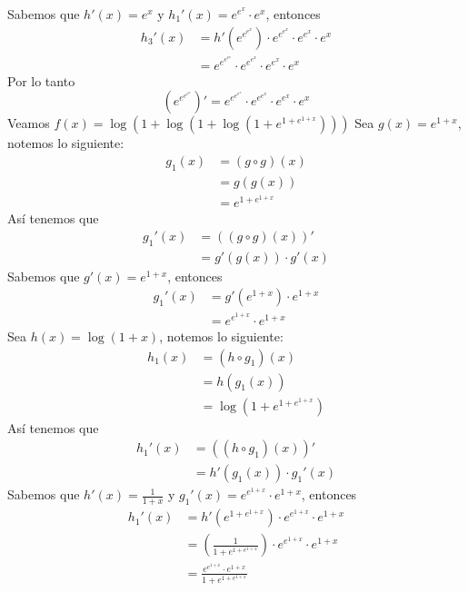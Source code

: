 \documentclass[a4paper]{article}
\begin{document}
Sabemos que \(h'(x) = e^{x}\) y \(h_{1}'(x) = e^{e^{x}} \cdot e^{x}\), entonces 
\begin{align*}
    h_{3}'(x) &= h'(e^{e^{e^{x}}}) \cdot e^{e^{e^{x}}} \cdot e^{e^{x}} \cdot e^{x}  \\
              &= e^{e^{e^{e^{x}}}} \cdot e^{e^{e^{x}}} \cdot e^{e^{x}} \cdot e^{x}
\end{align*}
Por lo tanto 
\[
    \boxed{\boxed{\left(e^{e^{e^{e^{x}}}}\right)' = e^{e^{e^{e^{x}}}} \cdot e^{e^{e^{x}}} \cdot e^{e^{x}} \cdot e^{x}}}  
\]
Veamos \(f(x) = \log{\left(1 + \log{\left(1 + \log{\left(1 + e^{1 + e^{1 + x}}\right)}\right)}\right)}\)
\newline
Sea \(g(x) = e^{1 + x}\), notemos lo siguiente:
\begin{align*}
    g_{1}\left(x\right) &= \left(g \circ g\right)(x) \\
                        &= g(g(x)) \\ 
                        &= e^{1 + e^{1 + x}}
\end{align*}
Así tenemos que
\begin{align*}
    g_{1}'(x) &= \left(\left(g \circ g\right)(x)\right)' \\
              &= g'(g(x))\cdot g'(x)
\end{align*}
Sabemos que \(g'(x) = e^{1 + x}\), entonces 
\begin{align*}
    g_{1}'(x) &= g'(e^{1 + x}) \cdot e^{1 + x} \\
              &= e^{e^{1 + x}} \cdot e^{1 + x}
\end{align*}
Sea \(h(x) = \log{\left(1 + x\right)}\), notemos lo siguiente:
\begin{align*}
    h_{1}\left(x\right) &= \left(h \circ g_{1}\right)(x) \\
                        &= h(g_{1}(x)) \\ 
                        &= \log{\left(1 + e^{1 + e^{1 + x}}\right)}  
\end{align*}
Así tenemos que
\begin{align*}
    h_{1}'(x) &= \left(\left(h \circ g_{1}\right)(x)\right)' \\
              &= h'(g_{1}(x))\cdot g_{1}'(x)
\end{align*}
Sabemos que \(h'(x) = \frac{1}{1 + x}\) y \(g_{1}'(x) = e^{e^{1 + x}} \cdot e^{1 + x} \), entonces
\begin{align*}
    h_{1}'(x) &= h'(e^{1 + e^{1 + x}}) \cdot e^{e^{1 + x}} \cdot e^{1 + x} \\
              &= \left(\frac{1}{1 + e^{1 + e^{1 + x}}}\right) \cdot e^{e^{1 + x}} \cdot e^{1 + x} \\
              &= \frac{e^{e^{1 + x}} \cdot e^{1 + x}}{1 + e^{1 + e^{1 + x}}}
\end{align*}
\end{document}
